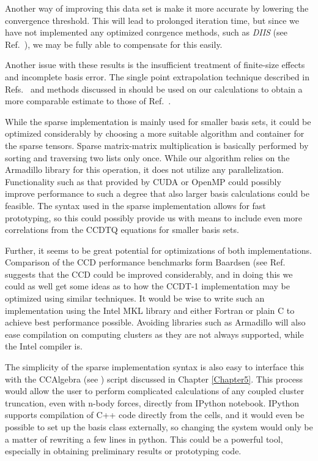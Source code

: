 Another way of improving this data set is make it more accurate by lowering the convergence threshold. This will lead to prolonged iteration time, but since we have not implemented any optimized conrgence methods, such as \emph{DIIS} (see Ref.~\cite{scuseria1986}), we may be fully able to compensate for this easily.

Another issue with these results is the insufficient treatment of finite-size effects and incomplete basis error. The single point extrapolation technique described in Refs.~\cite{Shepherd2012} and methods discussed in \cite{Drummond2007} should be used on our calculations to obtain a more comparable estimate to those of Ref.~\cite{Shepherd2013}.

While the sparse implementation is mainly used for smaller basis sets, it could be optimized considerably by choosing a more suitable algorithm and container for the sparse tensors. Sparse matrix-matrix multiplication is basically performed by sorting and traversing two lists only once. While our algorithm relies on the Armadillo library for this operation, it does not utilize any parallelization. Functionality such as that provided by CUDA \cite{cuda} or OpenMP \cite{openmp} could possibly improve performance to such a degree that also larger basis calculations could be feasible. The syntax used in the sparse implementation allows for fast prototyping, so this could possibly provide us with means to include even more correlations from the CCDTQ equations for smaller basis sets. 

Further, it seems to be great potential for optimizations of both implementations. Comparison of the CCD performance benchmarks form Baardsen (see Ref. \cite{Baardsen2015} suggests that the CCD could be improved considerably, and in doing this we could as well get some ideas as to how the CCDT-1 implementation may be optimized using similar techniques. It would be wise to write such an implementation using the Intel MKL library and either Fortran or plain C to achieve best performance possible. Avoiding libraries such as Armadillo will also ease compilation on computing clusters as they are not always supported, while the Intel compiler is.

The simplicity of the sparse implementation syntax is also easy to interface this with the CCAlgebra (see \cite{CCAlgebra}) script discussed in Chapter \ref{Chapter5}. This process would allow the user to perform complicated calculations of any coupled cluster truncation, even with n-body forces, directly from IPython notebook. IPython supports compilation of C++ code directly from the cells, and it would even be possible to set up the basis class externally, so changing the system would only be a matter of rewriting a few lines in python. This could be a powerful tool, especially in obtaining preliminary results or prototyping code.

